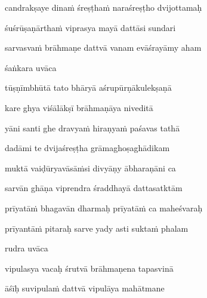 candrakṣaye dinaṁ śreṣṭhaṁ naraśreṣṭho dvijottamaḥ\thinspace{\dandab} \dontdisplaylinenum

śuśrūṣaṇārthaṁ viprasya mayā dattāsi sundari \danda\dontdisplaylinenum

sarvasvaṁ brāhmaṇe dattvā vanam evāśrayāmy aham \veg\dontdisplaylinenum
{}

śaṅkara uvāca~{\dandab}\dontdisplaylinenum 
{}

tūṣṇīmbhūtā tato bhāryā aśrupūrṇākulekṣaṇā\thinspace{\danda} \dontdisplaylinenum

kare ghya viśālākṣī brāhmaṇāya niveditā \veg\dontdisplaylinenum
{}

yāni santi ghe dravyaṁ hiraṇyaṁ paśavas tathā\thinspace{\dandab} \dontdisplaylinenum

dadāmi te dvijaśreṣṭha grāmaghoṣaghādikam \veg\dontdisplaylinenum
{}

muktā vaiḍūryavāsāṁsi divyāṇy ābharaṇāni ca\thinspace{\dandab} \dontdisplaylinenum

sarvān ghāṇa viprendra śraddhayā dattasatktām \veg\dontdisplaylinenum

prīyatāṁ bhagavān dharmaḥ prīyatāṁ ca maheśvaraḥ\thinspace{\dandab} \dontdisplaylinenum

prīyantāṁ pitaraḥ sarve yady asti suktaṁ phalam \veg\dontdisplaylinenum
{}

rudra uvāca~{\dandab}\dontdisplaylinenum 
{}

vipulasya vacaḥ śrutvā brāhmaṇena tapasvinā\thinspace{\danda} \dontdisplaylinenum

āśīḥ suvipulaṁ dattvā vipulāya mahātmane \veg\dontdisplaylinenum
{}


